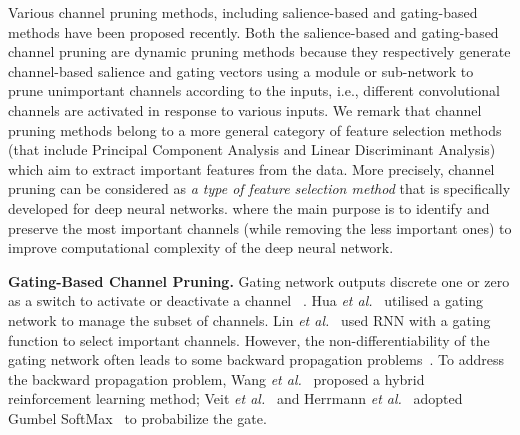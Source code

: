 \documentclass[lettersize,journal]{IEEEtran}
\begin{document}
Various channel pruning methods, including salience-based \cite{bejnordi2019batch,chen2019self,herrmann2018end,guo2020model,xia2021fully,su2020dynamic,bochkovskiy2020yolov4,tang2021manifold,li2021dynamic} and gating-based \cite{chen2018gaternet,hua2018channel, lin2017runtime} methods have been proposed recently. Both the salience-based and gating-based channel pruning are dynamic pruning methods because they respectively generate channel-based salience and gating vectors using a module or sub-network to prune unimportant channels according to the inputs, i.e., different convolutional channels are activated in response to various inputs. 
We remark that channel pruning methods belong to a more general category of feature selection methods (that include Principal Component Analysis and Linear Discriminant Analysis) which aim to extract important features from the data. More precisely, channel pruning can be considered as \textit{a type of feature selection method} that is specifically developed for deep neural networks. 
where the main purpose is to identify and preserve the most important channels (while removing the less important ones) to improve computational complexity of the deep neural network.



\textbf{Gating-Based Channel Pruning.}
Gating network outputs discrete one or zero as a switch to activate or deactivate a channel
~\cite{chen2018gaternet,hua2018channel,lin2017runtime}. Hua \textit{et al.}~\cite{hua2018channel} utilised a gating network to manage the subset of channels. Lin \textit{et al.}~\cite{lin2017runtime} used RNN with a gating function to select important channels. 
However, the non-differentiability of the gating network often leads to some backward propagation problems~\cite{han2021dynamic}. 
To address the backward propagation problem, Wang \textit{et al.}~\cite{wang2018skipnet} proposed a hybrid reinforcement learning method; Veit \textit{et al.}~\cite{veit2018convolutional} and Herrmann \textit{et al.}~\cite{herrmann2019end} adopted Gumbel SoftMax~\cite{gumbel1954statistical,jang2016categorical} to probabilize the gate.
\end{document}
